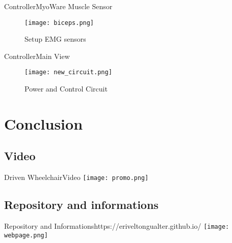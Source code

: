 \documentclass[10pt]{beamer}
\begin{document}
\begin{frame}{Controller}{MyoWare Muscle Sensor}
	\begin{figure}
	\centering
	\texttt{[image: biceps.png]}
	\caption{Setup EMG sensors}
	\end{figure}
\end{frame}
\begin{frame}{Controller}{Main View}
	\begin{figure}
	\centering
	\texttt{[image: new\_circuit.png]}
	\caption{Power and Control Circuit}
	\end{figure}
\end{frame}

\section{Conclusion}
\subsection{Video}
\begin{frame}{Driven Wheelchair}{Video}
\centering
\texttt{[image: promo.png]}
\end{frame}

\subsection{Repository and informations}
\begin{frame}{Repository and Informations}{https://eriveltongualter.github.io/}
\vspace*{0.2cm}
\hspace*{-0.5cm}\texttt{[image: webpage.png]}
\end{frame}

{\1
\begin{frame}
\end{frame}}
\end{document}
